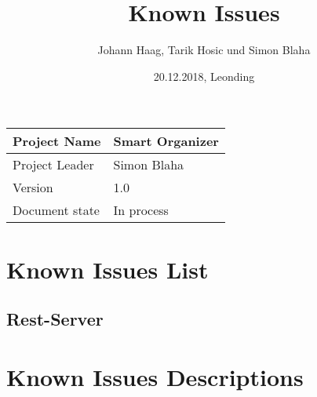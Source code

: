 \documentclass[12pt]{scrartcl}
\title{Known Issues}
\author{Johann Haag, Tarik Hosic und Simon Blaha}
\date{20.12.2018, Leonding}
\begin{document}
    \maketitle
    \begin{flushleft}
    \begin{tabular}{|l|l|}
    \hline
    Project Name & Smart Organizer \\ \hline
    Project Leader & Simon Blaha \\ \hline
    Version & 1.0\\ \hline
    Document state & In process \\ \hline
    \end{tabular}
    \end{flushleft}

    \pagebreak
    \tableofcontents
    \pagebreak

    \section{Known Issues List}
    \subsection{Rest-Server}
    \begin{itemize}
        

    \end{itemize}

    \section{Known Issues Descriptions}


\end{document}
